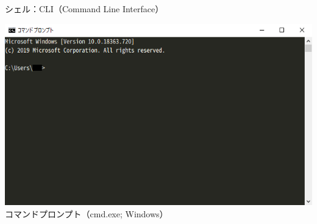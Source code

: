 \documentclass[12pt,aspectratio=169]{beamer}
\begin{document}
\begin{frame}{シェル：CLI（Command Line Interface）}

  \begin{minipage}{0.3\textwidth}
    \includegraphics[width=1.2\linewidth,bb=0 0 698 412]{./images/cmd.png}
    コマンドプロンプト（cmd.exe; Windows）


\end{minipage}
\end{frame}
\end{document}

